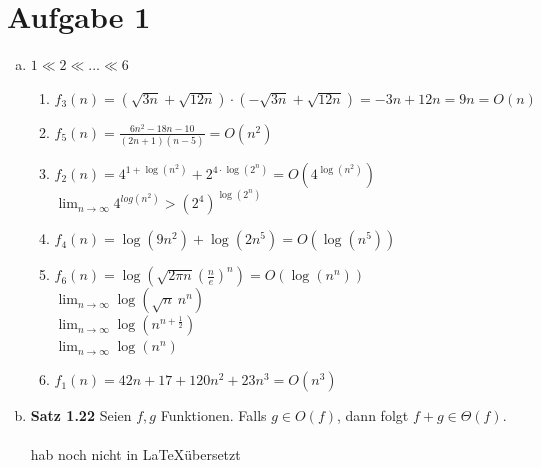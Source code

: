 \documentclass[a4paper,12pt]{scrartcl}
\begin{document}
\section*{Aufgabe 1}
\begin{enumerate}[a)]
	\item $1 \ll 2 \ll ... \ll 6$ %
	\begin{enumerate}[1.]
		\item $f_3(n) = \left(\sqrt{3n} + \sqrt{12n}\right) \cdot \left(-\sqrt{3n} + \sqrt{12n}\right) = -3n + 12n = 9n = O(n)$
		\item $f_5(n) = \frac{6n^2-18n-10}{(2n+1)(n-5)} = O(n^2)$

		\item $f_2(n) = 4^{1 + \log(n^2)} + 2^{4 \cdot \log(2^n)} = O(4^{\log(n^2)})$\\
			  $\lim_{n \to \infty}4^{log(n^2)} > (2^4)^{\log(2^n)}$
		
		\item $f_4(n) = \log(9n^2) + \log(2n^5) = O(\log(n^5))$
		\item $f_6(n) = \log\left(\sqrt{2 \pi n}\left(\frac{n}{e}\right)^{\!n}\right) = O(\log(n^n))$\\
		$\lim_{n \to \infty}\log(\sqrt{n}\ n^n)$\\
		$\lim_{n \to \infty}\log(n^{n+\frac{1}{2}})$\\
		$\lim_{n \to \infty}\log(n^n)$
		
		\item $f_1(n) = 42n + 17 + 120n^2 + 23n^3 = O(n^3)$

			  
	\end{enumerate}

	\item{
		\textbf{Satz 1.22} Seien $f, g$ Funktionen. Falls $g \in O(f)$, dann folgt $f + g \in \Theta(f)$.\\
		\\hab noch nicht in \LaTeX übersetzt
	} 
\end{enumerate}

\break
\end{document}

